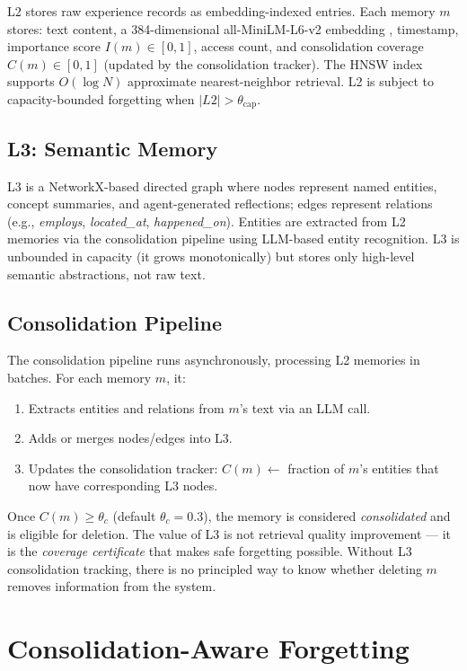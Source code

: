 \documentclass{article}
\begin{document}
L2 stores raw experience records as embedding-indexed entries.  Each memory
$m$ stores: text content, a 384-dimensional all-MiniLM-L6-v2 embedding
\citep{reimers2019sentence}, timestamp, importance score $I(m) \in [0,1]$,
access count, and consolidation coverage $C(m) \in [0,1]$ (updated by the
consolidation tracker).  The HNSW index \citep{malkov2018hnsw} supports
$O(\log N)$ approximate nearest-neighbor retrieval.  L2 is subject to
capacity-bounded forgetting when $|L2| > \theta_{\text{cap}}$.

\subsection{L3: Semantic Memory}

L3 is a NetworkX-based directed graph where nodes represent named entities,
concept summaries, and agent-generated reflections; edges represent
relations (e.g., \textit{employs}, \textit{located\_at}, \textit{happened\_on}).
Entities are extracted from L2 memories via the consolidation pipeline using
LLM-based entity recognition.  L3 is unbounded in capacity (it grows
monotonically) but stores only high-level semantic abstractions, not raw text.

\subsection{Consolidation Pipeline}

The consolidation pipeline runs asynchronously, processing L2 memories in
batches.  For each memory $m$, it:
\begin{enumerate}
\item Extracts entities and relations from $m$'s text via an LLM call.
\item Adds or merges nodes/edges into L3.
\item Updates the consolidation tracker: $C(m) \leftarrow$ fraction of $m$'s
  entities that now have corresponding L3 nodes.
\end{enumerate}
Once $C(m) \geq \theta_c$ (default $\theta_c = 0.3$), the memory is
considered \emph{consolidated} and is eligible for deletion.  The value of L3
is not retrieval quality improvement — it is the \emph{coverage certificate}
that makes safe forgetting possible.  Without L3 consolidation tracking, there
is no principled way to know whether deleting $m$ removes information from
the system.

\section{Consolidation-Aware Forgetting}
\label{sec:forgetting}
\end{document}
